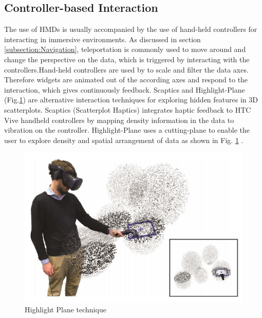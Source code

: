 \subsection{Controller-based Interaction}
\label{subsection:Controller-based Interaction}
The use of \ac{HMD}s is usually accompanied by the use of hand-held controllers for interacting in immersive environments. As discussed in section \ref{subsection:Navigation}, teleportation is commonly used to move around and change the perspective on the data, which is triggered by interacting with the controllers.\newline Hand-held controllers are used by \cite{Cordeil2017a} to scale and filter the data axes. Therefore widgets are animated out of the according axes and respond to the interaction, which gives continuously feedback.\newline
Scaptics and Highlight-Plane (Fig.\ref{figure:HighlightPlane}) are alternative interaction techniques for exploring hidden features in 3D scatterplots. Scaptics (Scatterplot Haptics) integrates haptic feedback to HTC Vive handheld controllers by mapping density information in the data to vibration on the controller. Highlight-Plane uses a cutting-plane to enable the user to explore density and spatial arrangement of data as shown in Fig. \ref{figure:HighlightPlane} \autocite[]{Prouzeau2019}.
 \begin{figure}[!h]
    \centering
	\includegraphics[width=0.5 \textwidth]{images/Prouzeau2019_HighlightPlane.JPG}
	\caption{
		Highlight Plane technique  \autocite{Prouzeau2019}
	}
	\label{figure:HighlightPlane} 
\end{figure}

